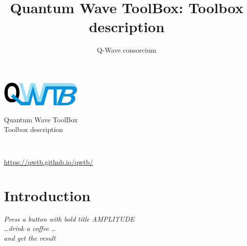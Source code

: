 \documentclass[12pt,a4paper,oneside]{report} %
\begin{document}
\renewcommand\floatpagefraction{.9} \renewcommand\topfraction{.9} \renewcommand\bottomfraction{.9} \renewcommand\textfraction{.1} \setcounter{totalnumber}{50} \setcounter{topnumber}{50} \setcounter{bottomnumber}{50} %
\renewcommand{\labelitemi}{--}          %
\setlength{\unitlength}{1mm}            %

\newenvironment{tightdesc}{\begin{description}[itemsep=0pt]} 
                              {\end{description}}

\def\infosection{Description}
\def\examplesection{Example}
\renewcommand{\chaptername}{}

\title{Quantum Wave ToolBox: Toolbox description}
\author{Q-Wave consorcium}

\thispagestyle{empty}
\begin{center}
        \vspace*{10em}
        {\huge
        \includegraphics[width=0.3\textwidth]{logo/qwtb_logo.pdf}

        \vspace{0.5em}
        Quantum Wave ToolBox\\

        \vspace{1.5em}
        Toolbox description}\\

        \vfill
        {\Large \color{red}{QWTB version 0.1}}

        \vspace{1em}
        {\Large \url{https://qwtb.github.io/qwtb/}}
\end{center}
\newpage

\tableofcontents

\chapter{Introduction} %
\bigskip
\begin{center}
        \parbox{0.7\textwidth}{\textit{Press a button with bold title AMPLITUDE\\
        \dots drink a coffee \dots\\
        and get the result}}
\end{center}
\end{document}
